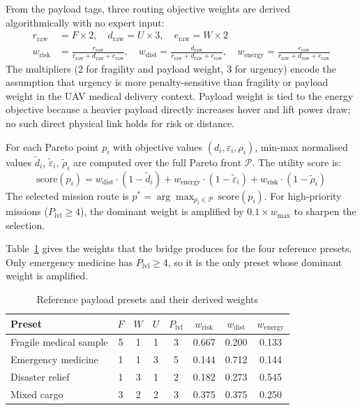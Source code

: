 \documentclass{ssnreview}
\begin{document}
From the payload tags, three routing objective weights are derived algorithmically with
no expert input:
\begin{align}
  r_\mathrm{raw} &= F \times 2, \quad d_\mathrm{raw} = U \times 3, \quad e_\mathrm{raw} = W \times 2 \label{eq:raw}\\
  w_\mathrm{risk} &= \frac{r_\mathrm{raw}}{r_\mathrm{raw} + d_\mathrm{raw} + e_\mathrm{raw}}, \quad
  w_\mathrm{dist} = \frac{d_\mathrm{raw}}{r_\mathrm{raw} + d_\mathrm{raw} + e_\mathrm{raw}}, \quad
  w_\mathrm{energy} = \frac{e_\mathrm{raw}}{r_\mathrm{raw} + d_\mathrm{raw} + e_\mathrm{raw}} \label{eq:weights}
\end{align}
The multipliers (2 for fragility and payload weight, 3 for urgency) encode the
assumption that urgency is more penalty-sensitive than fragility or payload weight in the
UAV medical delivery context. Payload weight is tied to the energy objective because a
heavier payload directly increases hover and lift power draw; no such direct physical
link holds for risk or distance.

For each Pareto point $p_i$ with objective values $(d_i, \varepsilon_i, \rho_i)$,
min-max normalised values $\tilde{d}_i$, $\tilde{\varepsilon}_i$, $\tilde{\rho}_i$ are
computed over the full Pareto front $\mathcal{P}$. The utility score is:
\begin{equation}
  \mathrm{score}(p_i) = w_\mathrm{dist}\cdot(1 - \tilde{d}_i) + w_\mathrm{energy}\cdot(1 - \tilde{\varepsilon}_i) + w_\mathrm{risk}\cdot(1 - \tilde{\rho}_i) \label{eq:score}
\end{equation}
The selected mission route is $p^* = \arg\max_{p_i \in \mathcal{P}}\,\mathrm{score}(p_i)$.
For high-priority missions ($P_\mathrm{lvl} \geq 4$), the dominant weight is amplified
by $0.1 \times w_\mathrm{max}$ to sharpen the selection.

Table~\ref{tab:presets} gives the weights that the bridge produces for the four reference
presets. Only emergency medicine has $P_\mathrm{lvl} \geq 4$, so it is the only preset
whose dominant weight is amplified.

\begin{table}[H]
\centering\caption{Reference payload presets and their derived weights}\label{tab:presets}\small
\begin{tabular}{l c c c c c c c}
\toprule
\textbf{Preset} & $F$ & $W$ & $U$ & $P_\mathrm{lvl}$ & $w_\mathrm{risk}$ & $w_\mathrm{dist}$ & $w_\mathrm{energy}$\\
\midrule
Fragile medical sample & 5 & 1 & 1 & 3 & 0.667 & 0.200 & 0.133\\
Emergency medicine     & 1 & 1 & 3 & 5 & 0.144 & 0.712 & 0.144\\
Disaster relief        & 1 & 3 & 1 & 2 & 0.182 & 0.273 & 0.545\\
Mixed cargo            & 3 & 2 & 2 & 3 & 0.375 & 0.375 & 0.250\\
\bottomrule
\end{tabular}
\end{table}
\end{document}

